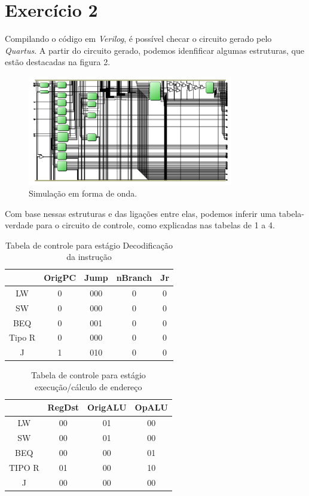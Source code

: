 \documentclass[12pt, a4paper, twoside]{article}
\begin{document}
\section{Exercício 2}

Compilando o código em \textit{Verilog}, é possível checar o circuito gerado pelo \textit{Quartus}. A partir do circuito gerado, podemos idenfificar algumas estruturas, que estão destacadas na figura 2.

\begin{figure}
    \centering
    \includegraphics[width=0.8\textwidth]{./figs/data_pipeline.png}
    \caption{Simulação em forma de onda.}
\end{figure}

Com base nessas estruturas e das ligações entre elas, podemos inferir uma tabela-verdade para o circuito de controle, como explicadas nas tabelas de 1 a 4.

\begin{table}[H]
    \centering
    \begin{tabular}{|ccccc|}
    \hline
      & OrigPC & Jump & nBranch & Jr \\
    \hline
    LW      & 0 & 000 & 0 & 0  \\
    SW      & 0 & 000 & 0 & 0  \\
    BEQ     & 0 & 001 & 0 & 0  \\
    Tipo R  & 0 & 000 & 0 & 0  \\
    J       & 1 & 010 & 0 & 0  \\
    \hline
    \end{tabular}
    \caption{Tabela de controle para estágio Decodificação da instrução}
\end{table}

\begin{table}[H]
    \centering
    \begin{tabular}{|cccc|}
    \hline
      & RegDst & OrigALU & OpALU \\
    \hline
    LW  & 00 & 01 & 00 \\
    SW  & 00 & 01 & 00 \\
    BEQ & 00 & 00 & 01 \\
    TIPO R & 01 & 00 & 10 \\
    J   & 00 & 00 & 00 \\
    \hline
    \end{tabular}
    \caption{Tabela de controle para estágio execução/cálculo de endereço}
\end{table}
\end{document}
